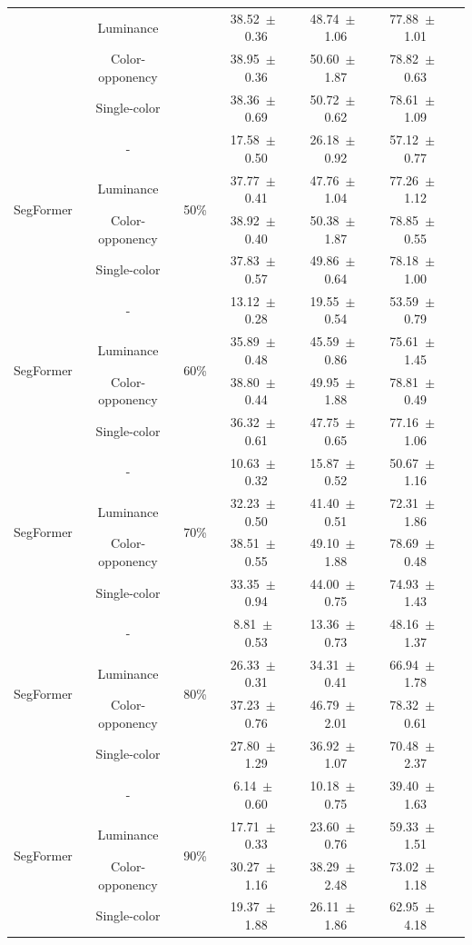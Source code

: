 \begin{table}[h]
\begin{tabular}{@{}lccc ccc@{}}
& Luminance & & 38.52~$\pm$~0.36 & 48.74~$\pm$~1.06 & 77.88~$\pm$~1.01 \\
& Color-opponency & & 38.95~$\pm$~0.36 & 50.60~$\pm$~1.87 & 78.82~$\pm$~0.63 \\
& Single-color & & 38.36~$\pm$~0.69 & 50.72~$\pm$~0.62 & 78.61~$\pm$~1.09 \\
\midrule
\multirow{4}{*}{SegFormer} & - & \multirow{4}{*}{50\%} & 17.58~$\pm$~0.50 & 26.18~$\pm$~0.92 & 57.12~$\pm$~0.77 \\
& Luminance & & 37.77~$\pm$~0.41 & 47.76~$\pm$~1.04 & 77.26~$\pm$~1.12 \\
& Color-opponency & & 38.92~$\pm$~0.40 & 50.38~$\pm$~1.87 & 78.85~$\pm$~0.55 \\
& Single-color & & 37.83~$\pm$~0.57 & 49.86~$\pm$~0.64 & 78.18~$\pm$~1.00 \\
\midrule
\multirow{4}{*}{SegFormer} & - & \multirow{4}{*}{60\%} & 13.12~$\pm$~0.28 & 19.55~$\pm$~0.54 & 53.59~$\pm$~0.79 \\
& Luminance & & 35.89~$\pm$~0.48 & 45.59~$\pm$~0.86 & 75.61~$\pm$~1.45 \\
& Color-opponency & & 38.80~$\pm$~0.44 & 49.95~$\pm$~1.88 & 78.81~$\pm$~0.49 \\
& Single-color & & 36.32~$\pm$~0.61 & 47.75~$\pm$~0.65 & 77.16~$\pm$~1.06 \\
\midrule
\multirow{4}{*}{SegFormer} & - & \multirow{4}{*}{70\%} & 10.63~$\pm$~0.32 & 15.87~$\pm$~0.52 & 50.67~$\pm$~1.16 \\
& Luminance & & 32.23~$\pm$~0.50 & 41.40~$\pm$~0.51 & 72.31~$\pm$~1.86 \\
& Color-opponency & & 38.51~$\pm$~0.55 & 49.10~$\pm$~1.88 & 78.69~$\pm$~0.48 \\
& Single-color & & 33.35~$\pm$~0.94 & 44.00~$\pm$~0.75 & 74.93~$\pm$~1.43 \\
\midrule
\multirow{4}{*}{SegFormer} & - & \multirow{4}{*}{80\%} & 8.81~$\pm$~0.53 & 13.36~$\pm$~0.73 & 48.16~$\pm$~1.37 \\
& Luminance & & 26.33~$\pm$~0.31 & 34.31~$\pm$~0.41 & 66.94~$\pm$~1.78 \\
& Color-opponency & & 37.23~$\pm$~0.76 & 46.79~$\pm$~2.01 & 78.32~$\pm$~0.61 \\
& Single-color & & 27.80~$\pm$~1.29 & 36.92~$\pm$~1.07 & 70.48~$\pm$~2.37 \\
\midrule
\multirow{4}{*}{SegFormer} & - & \multirow{4}{*}{90\%} & 6.14~$\pm$~0.60 & 10.18~$\pm$~0.75 & 39.40~$\pm$~1.63 \\
& Luminance & & 17.71~$\pm$~0.33 & 23.60~$\pm$~0.76 & 59.33~$\pm$~1.51 \\
& Color-opponency & & 30.27~$\pm$~1.16 & 38.29~$\pm$~2.48 & 73.02~$\pm$~1.18 \\
& Single-color & & 19.37~$\pm$~1.88 & 26.11~$\pm$~1.86 & 62.95~$\pm$~4.18 \\
\midrule
\bottomrule
\end{tabular}
\label{tab:sparse_results_segformer_acdc_full}
\end{table}
